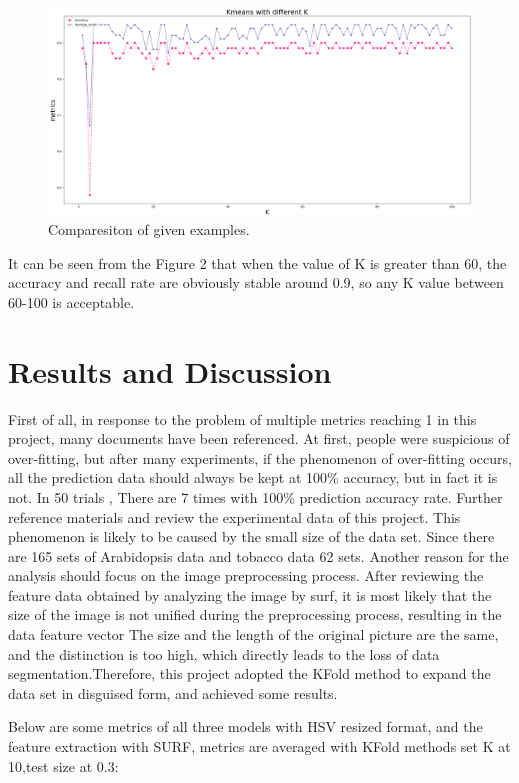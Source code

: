 \documentclass[conference]{IEEEtran}
\begin{document}
\begin{figure}[htbp]
\centerline{\includegraphics[scale=0.12]{p3.png}}
\caption{Comparesiton of given examples.}
\label{fig2}
\end{figure}
It can be seen from the Figure 2 that when the value of K is greater than 60, the accuracy and recall rate are obviously stable around 0.9, so any K value between 60-100 is acceptable.
\section{Results and Discussion}
First of all, in response to the problem of multiple metrics reaching 1 in this project, many documents have been referenced. At first, people were suspicious of over-fitting, but after many experiments, if the phenomenon of over-fitting occurs, all the prediction data should always be kept at 100\% accuracy, but in fact it is not. In 50 trials , There are 7 times with 100\% prediction accuracy rate. Further reference materials and review the experimental data of this project. This phenomenon is likely to be caused by the small size of the data set. Since  there are 165 sets of Arabidopsis data and tobacco data 62 sets. Another reason for the analysis should focus on the image preprocessing process. After reviewing the feature data obtained by analyzing the image by surf, it is most likely that the size of the image is not unified during the preprocessing process, resulting in the data feature vector The size and the length of the original picture are the same, and the distinction is too high, which directly leads to the loss of data segmentation.Therefore, this project adopted the KFold method to expand the data set in disguised form, and achieved some results.

Below are some metrics of all three models with HSV resized format, 
and the feature extraction with SURF, metrics are averaged with KFold methods set K at 10,test size at 0.3:
\end{document}
